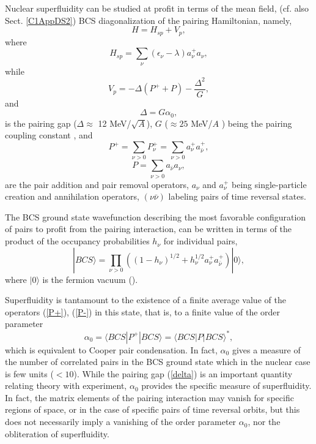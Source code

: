 Nuclear superfluidity can be studied at profit in terms  of the mean field, (cf. also Sect.  \ref{C1AppDS2}) BCS diagonalization
of the pairing Hamiltonian, namely,
\begin{equation}
H = H_{sp} + V_p,
\label{H}
\end{equation}
where
\begin{equation}
H_{sp} = \sum_{\nu} (\epsilon_{\nu} - \lambda) a^+_{\nu} a_{\nu},
\label{Hsp}
\end{equation}
while 
\begin{equation}
V_p = - \Delta (P^+ + P) - \frac{\Delta^2}{G},
\label{Vp}
\end{equation}
and
\begin{equation}
\Delta = G \alpha_0,
\label{delta}
\end{equation}
is the pairing gap ($\Delta \approx$ 12 MeV/$\sqrt{A}$), $G$ ($\approx 25$ MeV/$A$ ) being the pairing coupling constant \citep{Bohr:75},
and 
\begin{equation}
P^+ = \sum_{\nu>0} P^+_{\nu}= \sum_{\nu>0} a^+_{\nu}a^+_{\bar \nu},
\label{P+}
\end{equation}
\begin{equation}
P = \sum_{\nu >0} a_{\bar \nu} a_{\nu},
\label{P-}
\end{equation}
are the pair addition and pair removal  operators, $a_{\nu}$ and $a^+_{\nu}$  being single-particle  creation  and annihilation  operators,
$(\nu \bar \nu)$ labeling pairs of time reversal states.

The BCS ground state wavefunction describing the most favorable configuration  of pairs to profit from the pairing interaction, can be 
written in terms  of the product of the occupancy probabilities $h_{\nu}$ for individual pairs,
\begin{equation}
|BCS\rangle = \prod_{\nu>0} ( (1 - h_{\nu})^{1/2} + h_{\nu}^{1/2} a^+_{\nu}a^+_{\bar \nu}) |0\rangle,
\end{equation}
where $|0\rangle$ is the fermion vacuum (\cite{Schrieffer:64,Schrieffer:73}).

Superfluidity is tantamount to the existence of a finite average value of the operators  (\ref{P+}), (\ref{P-})
in this state, that is, to a finite value of the order parameter
\begin{equation}
\alpha_0 = \langle BCS|P^+|BCS\rangle = \langle BCS|P|BCS\rangle^*,
\end{equation}
 which is equivalent to Cooper pair condensation. In fact, $\alpha_0$ gives  a measure of the 
number of correlated pairs in the BCS ground state which in the nuclear case is few units ($<10$).
While the pairing gap (\ref{delta}) is an important quantity relating theory with experiment, $\alpha_0$ 
provides the specific measure  of superfluidity. In fact, the matrix elements of the pairing interaction
may vanish for specific regions of space,  or in the case of specific pairs of time reversal orbits, but this does not necessarily
imply a vanishing of the order parameter $\alpha_0$, nor the obliteration of superfluidity.

